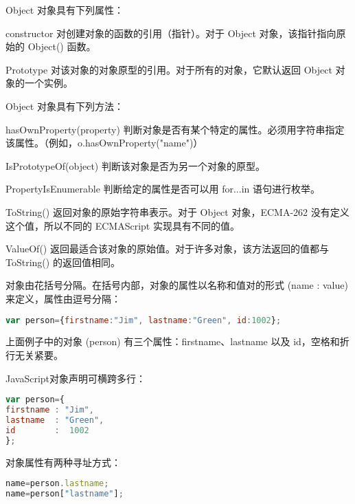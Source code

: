 Object 对象具有下列属性：

\begin{compactitem}
\item constructor
对创建对象的函数的引用（指针）。对于 Object 对象，该指针指向原始的 Object() 函数。
\item Prototype
对该对象的对象原型的引用。对于所有的对象，它默认返回 Object 对象的一个实例。
\end{compactitem}




Object 对象具有下列方法：

\begin{compactitem}
\item hasOwnProperty(property)
判断对象是否有某个特定的属性。必须用字符串指定该属性。（例如，o.hasOwnProperty("name")）
\item IsPrototypeOf(object)
判断该对象是否为另一个对象的原型。
\item PropertyIsEnumerable
判断给定的属性是否可以用 for...in 语句进行枚举。
\item ToString()
返回对象的原始字符串表示。对于 Object 对象，ECMA-262 没有定义这个值，所以不同的 ECMAScript 实现具有不同的值。
\item ValueOf()
返回最适合该对象的原始值。对于许多对象，该方法返回的值都与 ToString() 的返回值相同。
\end{compactitem}



对象由花括号分隔。在括号内部，对象的属性以名称和值对的形式 (name : value) 来定义，属性由逗号分隔：


\begin{lstlisting}[language=JavaScript]
var person={firstname:"Jim", lastname:"Green", id:1002};
\end{lstlisting}

上面例子中的对象 (person) 有三个属性：firstname、lastname 以及 id，空格和折行无关紧要。

JavaScript对象声明可横跨多行：


\begin{lstlisting}[language=JavaScript]
var person={
firstname : "Jim",
lastname  : "Green",
id        :  1002
};
\end{lstlisting}

对象属性有两种寻址方式：

\begin{lstlisting}[language=JavaScript]
name=person.lastname;
name=person["lastname"];
\end{lstlisting}


